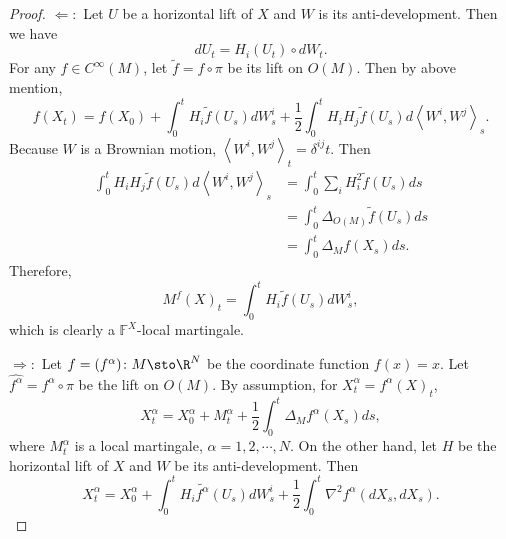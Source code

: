 \begin{proof}
    $\Leftarrow:$ Let $U$ be a horizontal lift of $X$ and $W$ is its anti-development. Then we have
    \begin{equation*}
        dU_t = H_i(U_t) \circ dW_t.
    \end{equation*}
    For any $f \in C^\infty(M)$, let $\widetilde{f} = f \circ \pi$ be its lift on $O(M)$. Then by above mention,
    \begin{equation*}
        f\left(X_t\right)=f\left(X_0\right)+\int_0^t H_i \widetilde{f}\left(U_s\right) d W_s^i+\frac{1}{2} \int_0^t H_i H_j \widetilde{f}\left(U_s\right) d\left\langle W^i, W^j\right\rangle_s.
    \end{equation*}
    Because $W$ is a Brownian motion, $\left\langle W^i, W^j\right\rangle_t = \delta^{ij}t$. Then
    \begin{align*}
        \int_0^t H_i H_j \widetilde{f}\left(U_s\right) d\left\langle W^i, W^j\right\rangle_s &=  \int_0^t\sum_i H_i^2 \widetilde{f}(U_s)ds \\
        &= \int_0^t \Delta_{O(M)}\widetilde{f}(U_s)ds \\
        &= \int_0^t \Delta_Mf(X_s)ds.
    \end{align*}
    Therefore,
    \begin{equation*}
        M^f(X)_t = \int_0^t H_i \widetilde{f}(U_s)dW^i_s,
    \end{equation*}
    which is clearly a $\mathbb{F}^X$-local martingale.

    $\Rightarrow:$ Let $f = (f^\alpha) \colon M \sto \R^N$ be the coordinate function $f(x) = x$. Let $\widehat{f^\alpha} = f^\alpha \circ \pi$ be the lift on $O(M)$. By assumption, for $X^\alpha_t = f^\alpha(X)_t$,
    \begin{equation*}
        X^\alpha_t = X_0^\alpha + M_t^\alpha + \frac{1}{2}\int_0^t\Delta_Mf^\alpha(X_s)ds,
    \end{equation*}
    where $M^\alpha_t$ is a local martingale, $\alpha=1,2,\cdots,N$. On the other hand, let $H$ be the horizontal lift of $X$ and $W$ be its anti-development. Then
    \begin{equation*}
        X_t^\alpha = X_0^\alpha + \int_0^t H_i\widetilde{f^\alpha}(U_s)dW^i_s + \frac{1}{2}\int_0^t \nabla^2f^\alpha(dX_s,dX_s).
    \end{equation*}


\end{proof}
